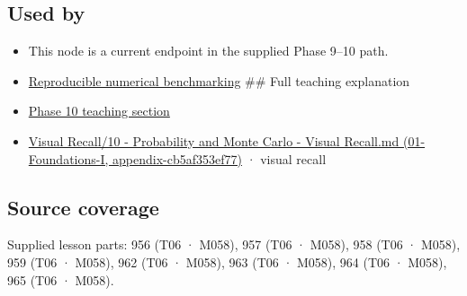 \subsection{Used by}\label{appendix-bcc44e9d3d02-used-by}

\begin{itemize}
\item
  This node is a current endpoint in the supplied Phase 9--10 path.
\item
  \hyperref[appendix-b9db93e28371]{Reproducible numerical benchmarking} \#\# Full teaching explanation
\item
  \hyperref[02-foundations-ii-ch030-inference-and-error-metrics-need-explicit-assumptions]{Phase 10 teaching section}
\item
  \href{../01-Foundations-I/main.pdf\#nameddest=appendix-cb5af353ef77}{Visual Recall/10 - Probability and Monte Carlo - Visual Recall.md (01-Foundations-I, appendix-cb5af353ef77)} · visual recall
\end{itemize}

\subsection{Source coverage}\label{appendix-bcc44e9d3d02-source-coverage}

Supplied lesson parts: 956 (T06 · M058), 957 (T06 · M058), 958 (T06 · M058), 959 (T06 · M058), 962 (T06 · M058), 963 (T06 · M058), 964 (T06 · M058), 965 (T06 · M058).

